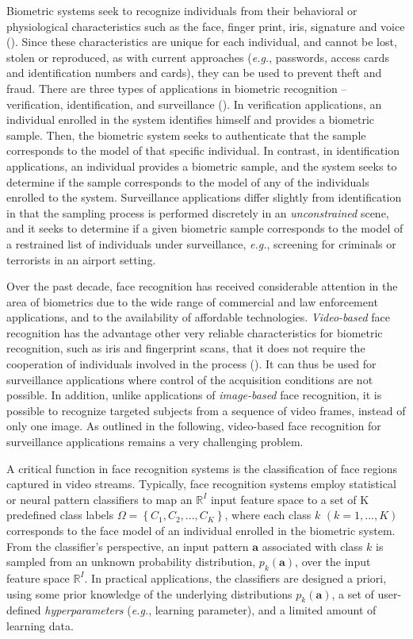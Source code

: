 Biometric systems seek to recognize individuals from their behavioral or physiological characteristics such as the face, finger print, iris, signature and voice (\cite{jain06}). Since these characteristics are unique for each individual, and cannot be lost, stolen or reproduced, as with current approaches (\emph{e.g.}, passwords, access cards and identification numbers and cards), they can be used to prevent theft and fraud. There are three types of applications in biometric recognition -- verification, identification, and surveillance (\cite{jain06}). In verification applications, an individual enrolled in the system identifies himself and provides a biometric sample. Then, the biometric system seeks to authenticate that the sample corresponds to the model of that specific individual. In contrast, in identification applications, an individual provides a biometric sample, and the system seeks to determine if the sample corresponds to the model of any of the individuals enrolled to the system. Surveillance applications differ slightly from identification in that the sampling process is performed discretely in an \emph{unconstrained} scene, and it seeks to determine if a given biometric sample corresponds to the model of a restrained list of individuals under surveillance, \emph{e.g.}, screening for criminals or terrorists in an airport setting.

Over the past decade, face recognition has received considerable attention in the area of biometrics due to the wide range of commercial and law enforcement applications, and to the availability of affordable technologies. \emph{Video-based} face recognition has the advantage other very reliable characteristics for biometric recognition, such as iris and fingerprint scans, that it does not require the cooperation of individuals involved in the process (\cite{zhao03}). It can thus be used for surveillance applications where control of the acquisition conditions are not possible. In addition, unlike applications of \emph{image-based} face recognition, it is possible to recognize targeted subjects from a sequence of video frames, instead of only one image. As outlined in the following, video-based face recognition for surveillance applications remains a very challenging problem.

A critical function in face recognition systems is the classification of face regions captured in video streams. Typically, face recognition systems employ statistical or neural pattern classifiers to map an $\mathbb{R}^I$ input feature space to a set of K predefined class labels $\Omega = \left\{C_1, C_2, ..., C_K\right\}$, where each class $k$ $(k=1,...,K)$ corresponds to the face model of an individual enrolled in the biometric system. From the classifier's perspective, an input pattern $\textbf{a}$ associated with class $k$ is sampled from an unknown probability distribution, $p_k(\textbf{a})$, over the input feature space $\mathbb{R}^I$. In practical applications, the classifiers are designed a priori, using some prior knowledge of the underlying distributions $p_k(\textbf{a})$, a set of user-defined \emph{hyperparameters} (\emph{e.g.}, learning parameter), and a limited amount of learning data.

